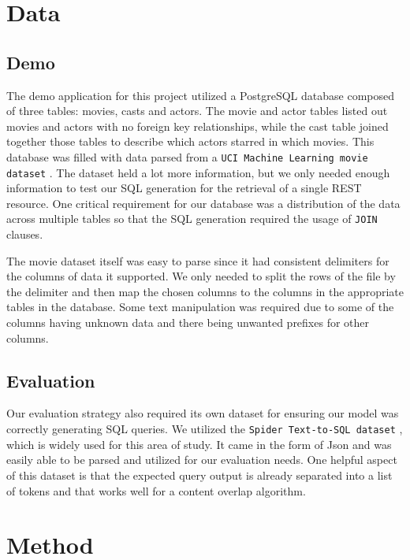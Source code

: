 \documentclass[11pt]{article}
\begin{document}
\section{Data}

\subsection{Demo}

The demo application for this project utilized a PostgreSQL database composed of three tables: movies, casts and actors. The movie and actor tables listed out movies and actors with no foreign key relationships, while the cast table joined together those tables to describe which actors starred in which movies. This database was filled with data parsed from a \texttt{UCI Machine Learning movie dataset} \citep{misc_movie_132}. The dataset held a lot more information, but we only needed enough information to test our SQL generation for the retrieval of a single REST resource. One critical requirement for our database was a distribution of the data across multiple tables so that the SQL generation required the usage of \texttt{JOIN} clauses.

The movie dataset itself was easy to parse since it had consistent delimiters for the columns of data it supported. We only needed to split the rows of the file by the delimiter and then map the chosen columns to the columns in the appropriate tables in the database. Some text manipulation was required due to some of the columns having unknown data and there being unwanted prefixes for other columns.

\subsection{Evaluation}

Our evaluation strategy also required its own dataset for ensuring our model was correctly generating SQL queries. We utilized the \texttt{Spider Text-to-SQL dataset} \citep{yu2019spider}, which is widely used for this area of study. It came in the form of Json and was easily able to be parsed and utilized for our evaluation needs. One helpful aspect of this dataset is that the expected query output is already separated into a list of tokens and that works well for a content overlap algorithm.

\section{Method}
\end{document}
